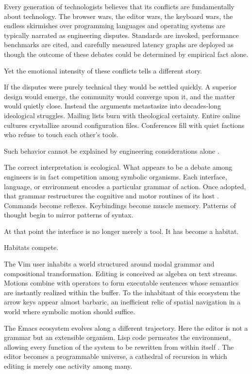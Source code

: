 \documentclass[11pt]{article}
\theoremstyle{definition}
\begin{document}
Every generation of technologists believes that its conflicts are
fundamentally about technology. The browser wars, the editor wars, the
keyboard wars, the endless skirmishes over programming languages and
operating systems are typically narrated as engineering disputes.
Standards are invoked, performance benchmarks are cited, and carefully
measured latency graphs are deployed as though the outcome of these
debates could be determined by empirical fact alone.

Yet the emotional intensity of these conflicts tells a different story.

If the disputes were purely technical they would be settled quickly. A
superior design would emerge, the community would converge upon it, and
the matter would quietly close. Instead the arguments metastasize into
decades-long ideological struggles. Mailing lists burn with theological
certainty. Entire online cultures crystallize around configuration files.
Conferences fill with quiet factions who refuse to touch each other's
tools.

Such behavior cannot be explained by engineering considerations alone
\cite{brooks1975}.

The correct interpretation is ecological. What appears to be a debate
among engineers is in fact competition among symbolic organisms. Each
interface, language, or environment encodes a particular grammar of
action. Once adopted, that grammar restructures the cognitive and motor
routines of its host \cite{norman1988}. Commands become reflexes.
Keybindings become muscle memory. Patterns of thought begin to mirror
patterns of syntax.

At that point the interface is no longer merely a tool. It has become a
habitat.

Habitats compete.

The Vim user inhabits a world structured around modal grammar and
compositional transformation. Editing is conceived as algebra on text
streams. Motions combine with operators to form executable sentences
whose semantics are instantly realized within the buffer. To the
inhabitant of this ecosystem the arrow keys appear almost barbaric, an
inefficient relic of spatial navigation in a world where symbolic motion
should suffice.

The Emacs ecosystem evolves along a different trajectory. Here the editor
is not a grammar but an extensible organism. Lisp code permeates the
environment, allowing every function of the system to be rewritten from
within itself \cite{stallman2002}. The editor becomes a programmable
universe, a cathedral of recursion in which editing is merely one
activity among many.
\end{document}
